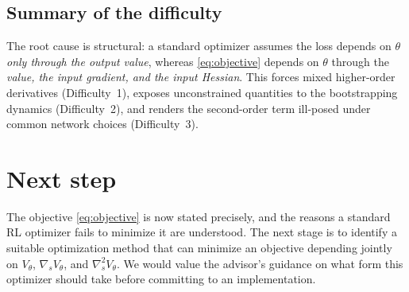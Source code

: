 \documentclass[11pt]{article}
\newcommand{\grads}{\nabla_s}
\newcommand{\hess}{\nabla_s^2}
\begin{document}
\subsection*{Summary of the difficulty}
The root cause is structural: a standard optimizer assumes the loss
depends on $\theta$ \emph{only through the output value}, whereas
\eqref{eq:objective} depends on $\theta$ through the \emph{value, the input
gradient, and the input Hessian}. This forces mixed higher-order
derivatives (Difficulty~1), exposes unconstrained quantities to the
bootstrapping dynamics (Difficulty~2), and renders the second-order term
ill-posed under common network choices (Difficulty~3).

\section{Next step}
The objective \eqref{eq:objective} is now stated precisely, and the reasons
a standard RL optimizer fails to minimize it are understood. The next stage
is to identify a suitable optimization method that can minimize an objective
depending jointly on $V_\theta$, $\grads V_\theta$, and $\hess V_\theta$.
We would value the advisor's guidance on what form this optimizer should
take before committing to an implementation.
\end{document}
